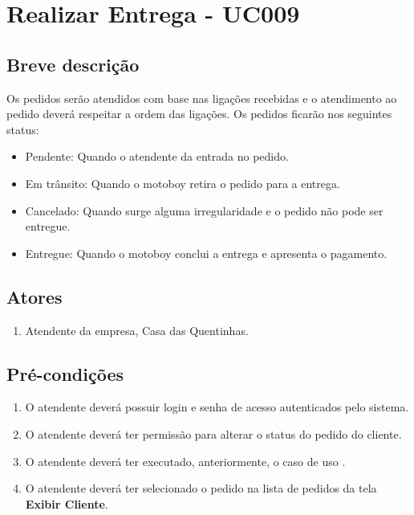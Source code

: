 \chapter{Realizar Entrega - UC009} \label{uc009}

\section{Breve descrição}

Os pedidos serão atendidos com base nas ligações recebidas e o atendimento ao pedido deverá respeitar a ordem das ligações. Os pedidos ficarão nos seguintes status:

\begin{itemize}
	\item Pendente: Quando o atendente da entrada no pedido.
	\item Em trânsito: Quando o motoboy retira o pedido para a entrega.
	\item Cancelado: Quando surge alguma irregularidade e o pedido não pode ser entregue.
	\item Entregue: Quando o motoboy conclui a entrega e apresenta o pagamento.
\end{itemize}

\section{Atores}

\begin{enumerate}
	\item Atendente da empresa, Casa das Quentinhas.
\end{enumerate}

\section{Pré-condições}

\begin{enumerate}
	\item O atendente deverá possuir login e senha de acesso autenticados pelo sistema.
	\item O atendente deverá ter permissão para alterar o status do pedido do cliente.
	\item O atendente deverá ter executado, anteriormente, o caso de uso .
	\item O atendente deverá ter selecionado o pedido na lista de pedidos da tela \textbf{Exibir Cliente}.
\end{enumerate}

